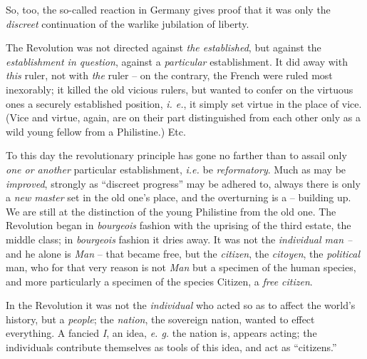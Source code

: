 \documentclass[12pt,a4paper]{book}
\begin{document}
So, too, the so-called reaction in Germany gives proof that it was only the 
\textit{discreet} continuation of the warlike jubilation of liberty.

The Revolution was not directed against \textit{the established}, but against 
the \textit{establishment in question}, against a \textit{particular} 
establishment. It did away with \textit{this} ruler, not with \textit{the} 
ruler -- on the contrary, the French were ruled most inexorably; it killed the 
old vicious rulers, but wanted to confer on the virtuous ones a securely 
established position, \textit{i. e.}, it simply set virtue in the place of 
vice. (Vice and virtue, again, are on their part distinguished from each other 
only as a wild young fellow from a Philistine.) Etc.

To this day the revolutionary principle has gone no farther than to assail 
only \textit{one or another} particular establishment, \textit{i.e.} be 
\textit{reformatory}. Much as may be \textit{improved}, strongly as 
``discreet progress'' may be adhered to, always there is only a \textit{new 
master} set in the old one's place, and the overturning is a -- building up. 
We are still at the distinction of the young Philistine from the old one. The 
Revolution began in \textit{bourgeois} fashion with the uprising of the third 
estate, the middle class; in \textit{bourgeois} fashion it dries away. It was 
not the \textit{individual man --} and he alone is \textit{Man} -- that became 
free, but the \textit{citizen}, the \textit{citoyen}, the \textit{political} 
man, who for that very reason is not \textit{Man} but a specimen of the human 
species, and more particularly a specimen of the species Citizen, a 
\textit{free citizen}.

In the Revolution it was not the \textit{individual} who acted so as to affect 
the world's history, but a \textit{people}; the \textit{nation}, the sovereign 
nation, wanted to effect everything. A fancied \textit{I}, an idea, \textit{e. 
g.} the nation is, appears acting; the individuals contribute themselves as 
tools of this idea, and act as ``citizens.''
\end{document}

